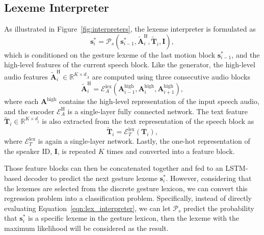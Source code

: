 \documentclass[acmtog,authorversion]{acmart}
\newcommand{\vect}[1]{\bm{#1}}
\newcommand{\tildevect}[1]{\vect{\tilde{#1}}}
\newcommand{\eqword}[1]{{\text{#1}}}
\newcommand{\fig}{Figure{}~}
\newcommand{\eqn}{Equation{}~}
\begin{document}
\subsection{Lexeme Interpreter}
\label{subsec:lexeme_interpreter}
As illustrated in \fig\ref{fig:interpreters}, the lexeme interpreter is formulated as
\begin{equation}
    \vect{s}_i^*=\mathcal{P}_s(\vect{s}_{i-1}^*, \tildevect{A}_i^{\eqword{H}}, \tildevect{T}_i, \vect{I}), 
    \label{eqn:lex_interpreter}
\end{equation}
which is conditioned on the gesture lexeme of the last motion block $\vect{s}_{i-1}^*$, and the high-level features of the current speech block. Like the generator, the high-level audio features $\tildevect{A}_i^{\eqword{H}}\in\mathbb{R}^{K\times{}d_{\tilde{A}}}$ are computed using three consecutive audio blocks
\begin{equation}
    \tildevect{A}_i^{\eqword{H}}=\mathcal{E}_A^{\eqword{lex}}(\vect{A}^{\eqword{high}}_{i-1},\vect{A}^{\eqword{high}}_{i},\vect{A}^{\eqword{high}}_{i+1}),
\end{equation}
where each $\vect{A}^{\eqword{high}}$ contains the high-level representation of the input speech audio, and the encoder $\mathcal{E}_A^{\eqword{H}}$ is a single-layer fully connected network. 
The text feature $\tildevect{T}_i\in\mathbb{R}^{K\times{}d_{\tilde{t}}}$ is also extracted from the text representation of the speech block as 
\begin{equation}
    \tildevect{T}_i=\mathcal{E}_T^{\eqword{lex}}(\vect{T}_i),
\end{equation}
where $\mathcal{E}_T^{\eqword{lex}}$ is again a single-layer network. Lastly, the one-hot representation of the speaker ID, $\vect{I}$, is repeated $K$ times and converted into a feature block.

Those feature blocks can then be concatenated together and fed to an LSTM-based decoder to predict the next gesture lexeme $\vect{s}_i^*$. However, considering that the lexemes are selected from the discrete gesture lexicon, we can convert this regression problem into a classification problem. Specifically, instead of directly evaluating \eqn\eqref{eqn:lex_interpreter}, we can let $\mathcal{P}_s$ predict the probability that $\vect{s}_i^*$ is a specific lexeme in the gesture lexicon, then the lexeme with the maximum likelihood will be considered as the result.
\end{document}
